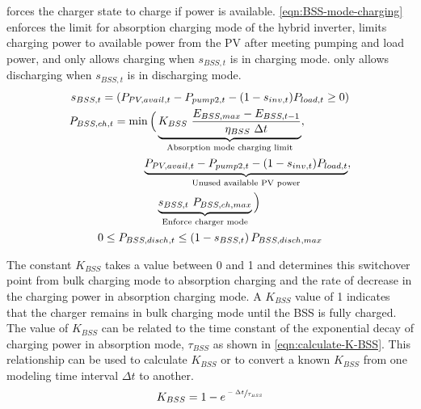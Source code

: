  forces the charger state to charge if power is available.
\cref{eqn:BSS-mode-charging} enforces the limit for absorption charging mode of the hybrid inverter,
limits charging power to available power from the PV after meeting pumping and load power,
and only allows charging when $s_{BSS,t}$ is in charging mode.
 only allows discharging when $s_{BSS,t}$ is in discharging mode.
%
\begin{gather}
\label{eqn:sBSS}
s_{BSS,t} = \left( P_{PV,avail,t} - P_{pump2,t} - (1 - s_{inv,t}) P_{load,t} \ge 0 \right)
\\
\label{eqn:BSS-mode-charging}
\begin{aligned}
P_{BSS,ch,t} = \min\Big(
& \underbrace{K_{BSS} \ \frac{E_{BSS,max} - E_{BSS,t-1}}{\eta_{BSS} \ \Delta t}}_
{\textrm{Absorption mode charging limit}},
\\
& \mkern-22mu \underbrace{P_{PV,avail,t} - P_{pump2,t} - (1 - s_{inv,t}) P_{load,t}}_
{\textrm{Unused available PV power}},
\\
& \underbrace{s_{BSS,t} \ P_{BSS,ch,max}}_  
{\textrm{Enforce charger mode}} \Big)
\end{aligned}
\\
\label{eqn:BSS-mode-discharging}
0 \le P_{BSS,disch,t} \le \left(1 - s_{BSS,t}\right) P_{BSS,disch,max}
\end{gather}

The constant $K_{BSS}$ takes a value between 0 and 1 and determines this switchover point from bulk charging mode to absorption charging and the rate of decrease in the charging power in absorption charging mode. A $K_{BSS}$ value of 1 indicates that the charger remains in bulk charging mode until the BSS is fully charged. The value of $K_{BSS}$ can be related to the time constant of the exponential decay of charging power in absorption mode, $\tau_{BSS}$ as shown in \cref{eqn:calculate-K-BSS}. This relationship can be used to calculate $K_{BSS}$ or to convert a known $K_{BSS}$ from one modeling time interval $\Delta t$ to another.
%
\begin{equation}
\label{eqn:calculate-K-BSS}
K_{BSS} = 1 - e^{\sfrac{-\Delta t}{\tau_{BSS}}}
\end{equation}

